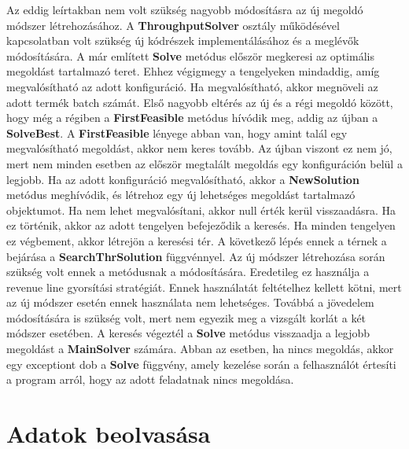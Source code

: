 Az eddig leírtakban nem volt szükség nagyobb módosításra az új megoldó módszer létrehozásához.
A \textbf{ThroughputSolver} osztály működésével kapcsolatban volt szükség új kódrészek implementálásához és a meglévők módosítására.
A már említett \textbf{Solve} metódus először megkeresi az optimális megoldást tartalmazó teret.
Ehhez végigmegy a tengelyeken mindaddig, amíg megvalósítható az adott konfiguráció.
Ha megvalósítható, akkor megnöveli az adott termék batch számát.
Első nagyobb eltérés az új és a régi megoldó között, hogy még a régiben a \textbf{FirstFeasible} metódus hívódik meg, addig az újban a \textbf{SolveBest}.
A \textbf{FirstFeasible} lényege abban van, hogy amint talál egy megvalósítható megoldást, akkor nem keres tovább.
Az újban viszont ez nem jó, mert nem minden esetben az először megtalált megoldás egy konfiguráción belül a legjobb. Ha az adott konfiguráció megvalósítható, akkor a \textbf{NewSolution}
metódus meghívódik, és létrehoz egy új lehetséges megoldást tartalmazó objektumot.
Ha nem lehet megvalósítani, akkor null érték kerül visszaadásra.
Ha ez történik, akkor az adott tengelyen befejeződik a keresés.
Ha minden tengelyen ez végbement, akkor létrejön a keresési tér.
A következő lépés ennek a térnek a bejárása a \textbf{SearchThrSolution} függvénnyel.
Az új módszer létrehozása során szükség volt ennek a metódusnak a módosítására.
Eredetileg ez használja a revenue line gyorsítási stratégiát.
Ennek használatát feltételhez kellett kötni, mert az új módszer esetén ennek használata nem lehetséges.
Továbbá a jövedelem módosítására is szükség volt, mert nem egyezik meg a vizsgált korlát a két módszer esetében.
A keresés végeztél a \textbf{Solve} metódus visszaadja a legjobb megoldást a \textbf{MainSolver} számára.
Abban az esetben, ha nincs megoldás, akkor egy exceptiont dob a \textbf{Solve} függvény, amely kezelése során a felhasználót értesíti a program arról, hogy az adott feladatnak nincs megoldása.

\section{Adatok beolvasása}
